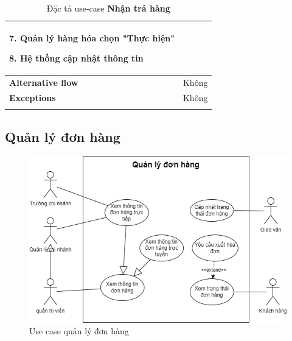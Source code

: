 {\begin{longtable}{| p{} | p{} |}
                    7. Quản lý hàng hóa chọn "Thực hiện"
                    
                    8. Hệ thống cập nhật thông tin
                \\
                \hline
                    \textbf{Alternative flow}
                &
                    Không
                \\
                \hline
                    \textbf{Exceptions} 
                &
                    Không
                \\
                \hline
                \caption{Đặc tả use-case \textbf{Nhận trả hàng}}
            \end{longtable}
        }

\newpage

    \subsection{Quản lý đơn hàng}
        \begin{figure}[!htp]
            \centering
            \includegraphics[width=5in]{img/UseCase/UseCase-Quản lý đơn hàng.drawio.png}
            \newline
            \caption{Use case quản lý đơn hàng}
        \end{figure}
    
